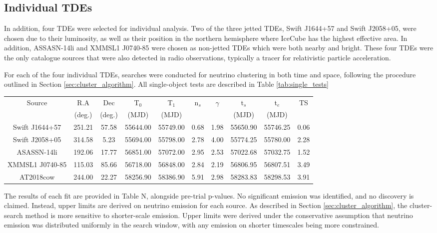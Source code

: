 \subsection{Individual TDEs}

In addition, four TDEs were selected for individual analysis. Two of the three jetted TDEs, Swift J1644+57 and Swift J2058+05, were chosen due to their luminosity, as well as their position in the northern hemisphere where IceCube has the highest effective area. In addition, ASSASN-14li and  XMMSL1 J0740-85 were chosen as non-jetted TDEs which were both nearby and bright. These four TDEs were the only catalogue sources that were also detected in radio observations, typically a tracer for relativistic particle acceleration.

For each of the four individual TDEs, searches were conducted for neutrino clustering in both time and space, following the procedure outlined in Section \ref{sec:cluster_algorithm}. All single-object tests are described in Table \ref{tab:single_tests}

\begin{table*}[]
	\centering
	\begin{tabular}{||c |c c c c | c c c c| c||} 
	\hline
	Source & R.A & Dec & T$_{0}$ & T$_{1}$ & n$_{s}$ & $\gamma$ & t$_{s}$ & t$_{e}$ & TS\\
	& (deg.) & (deg.) & (MJD) & (MJD) & & & (MJD) & (MJD) & \\
	\hline
	Swift J1644+57 & 251.21 & 57.58 & 55644.00 & 55749.00 & 0.68 & 1.98 & 55650.90 & 55746.25 & 0.06\\
	Swift J2058+05 & 314.58 & 5.23 & 55694.00 & 55798.00 & 2.78 & 4.00 & 55774.25 & 55780.00 & 2.28\\
	ASASSN-14li & 192.06 & 17.77 & 56851.00 & 57072.00 & 2.95 & 2.53 & 57022.68 & 57032.75 & 1.52\\
	XMMSL1 J0740-85 & 115.03 & 85.66 & 56718.00 & 56848.00 & 2.84 & 2.19 & 56806.95 & 56807.51 & 3.49\\
	\hline
	AT2018cow & 244.00 & 22.27 & 58256.90 & 58386.90 & 5.91 & 2.98 & 58283.83 & 58298.53 & 3.91\\
	\hline
	\end{tabular}
	\caption{Summary of the five individual TDEs for which the temporal-cluster-search method was applied. All but AT2018cow were included in the stacking analysis.}
	\label{tab:single_tests}
\end{table*}{}

The results of each fit are provided in Table N, alongside pre-trial p-values. No significant emission was identified, and no discovery is claimed. Instead, upper limits are derived on neutrino emission for each source. As described in Section \ref{sec:cluster_algorithm}, the cluster-search method is more sensitive to shorter-scale emission. Upper limits were derived under the conservative assumption that neutrino emission was distributed uniformly in the search window, with any emission on shorter timescales being more constrained. 

